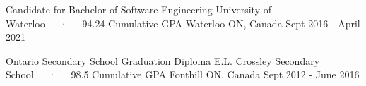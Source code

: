 
\begin{cventries}

\vspace{0.5mm}

\cventryshort
    {Candidate for Bachelor of Software Engineering}
    {University of Waterloo~~~·~~~94.24 Cumulative GPA}
    {Waterloo ON, Canada}
    {Sept 2016 - April 2021}

\cventryshort
    {Ontario Secondary School Graduation Diploma}
    {E.L. Crossley Secondary School~~~·~~~98.5 Cumulative GPA}
    {Fonthill ON, Canada}
    {Sept 2012 - June 2016}

\end{cventries}
